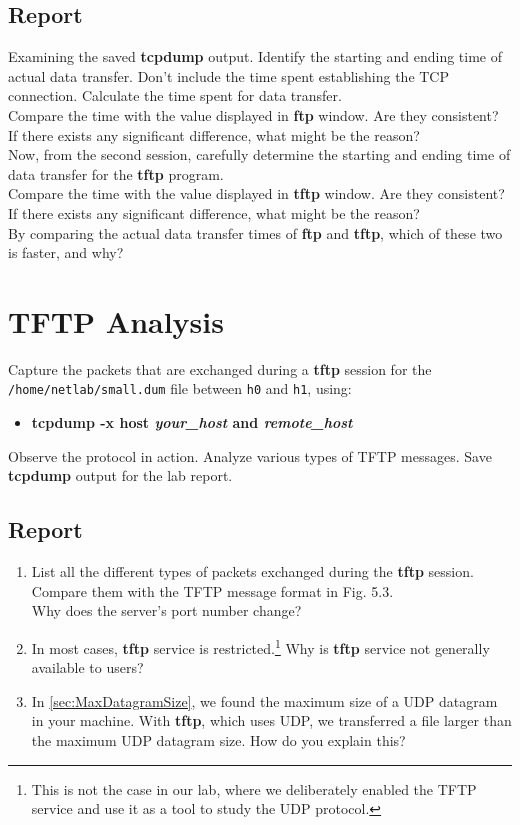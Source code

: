 \documentclass[10pt,a4paper]{article}
\numberwithin{equation}{section}
\numberwithin{figure}{section}
\numberwithin{table}{section}
\begin{document}
	\subsection*{Report}
	Examining the saved \textbf{tcpdump} output. Identify the starting and ending time of actual data transfer.
	Don’t include the time spent establishing the TCP connection.
	Calculate the time spent for data transfer. \\
	Compare the time with the value displayed in \textbf{ftp} window.
	Are they consistent?
	If there exists any significant difference, what might be the reason? \\
	Now, from the second session, carefully determine the starting and ending time of data transfer for the \textbf{tftp} program. \\
	Compare the time with the value displayed in \textbf{tftp} window.
	Are they consistent?
	If there exists any significant difference, what might be the reason? \\
	By comparing the actual data transfer times of \textbf{ftp} and \textbf{tftp}, which of these two is faster, and why?

\section{TFTP Analysis}
	Capture the packets that are exchanged during a \textbf{tftp} session for the \linebreak \texttt{/home/netlab/small.dum} file between \texttt{h0} and \texttt{h1}, using:
	\begin{itemize}
		\item \textbf{tcpdump -x host \textit{your\_host} and \textit{remote\_host}}
	\end{itemize}
	Observe the protocol in action.	Analyze various types of TFTP messages. Save \textbf{tcpdump} output for the lab report.
	\subsection*{Report}
	\begin{enumerate}
		\item List all the different types of packets exchanged during the \textbf{tftp} session. Compare them with the TFTP message format in Fig. 5.3.\\ Why does the server’s port number change?
		\item In most cases, \textbf{tftp} service is restricted.\footnote{This is not the case in our lab, where we deliberately enabled the TFTP service and use it as a tool to study the UDP protocol.}
		Why is \textbf{tftp} service not generally available to users?
		\item In \autoref{sec:MaxDatagramSize}, we found the maximum size of a UDP datagram in your machine. With \textbf{tftp}, which uses UDP, we transferred a file larger than the maximum UDP datagram size.
		How do you explain this?
	\end{enumerate}
\end{document}
